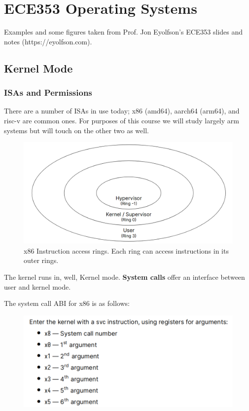 \documentclass[../notes.tex]{subfiles}
\begin{document}
\section{ECE353 Operating Systems}

\begin{blockquote}
    Examples and some figures taken from Prof. Jon Eyolfson's ECE353 slides and notes (https://eyolfson.com).
\end{blockquote}


\subsection{Kernel Mode}
\subsubsection{ISAs and Permissions}

There are a number of ISAs in use today; x86 (amd64), aarch64 (arm64), and risc-v are common ones.
For purposes of this course we will study largely arm systems but will touch on the other two as well.

\begin{figure}[H]
  \centering
  \includegraphics[width=0.8\linewidth]{img/image_2023-01-11-15-18-10.png}
  \caption{x86 Instruction access rings. Each ring can access instructions in its outer rings.}
\end{figure}

The kernel runs in, well, Kernel mode. \textbf{System calls} offer an interface between user and kernel mode. 


The system call ABI for x86 is as follows:

\begin{figure}[H]
  \centering
  \includegraphics[width=0.8\linewidth]{img/image_2023-01-11-15-23-26.png}
\end{figure}
\end{document}
